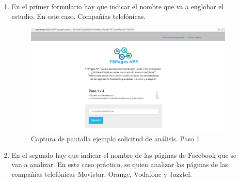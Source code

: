 \begin{itemize}
\begin{enumerate}
\item En el primer formulario hay que indicar el nombre que va a englobar el estudio. En este caso, Compañías telefónicas. 
\begin{figure}[H]
\centering
\includegraphics[width=5in]{figuras/ejemploPaso1.png}
\caption{Captura de pantalla ejemplo solicitud de análisis. Paso 1} \label{fig:exPaso1}
\end{figure}
\item En el segundo hay que indicar el nombre de las páginas de Facebook que se van a analizar. En este caso práctico, se quien analizar las páginas de las compañías telefónicas Movistar, Orange, Vodafone y Jazztel. 


\end{enumerate}
\end{itemize}
